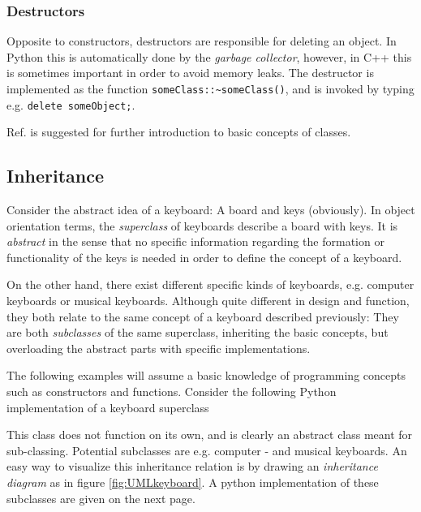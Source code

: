 \subsubsection{Destructors}

Opposite to constructors, destructors are responsible for deleting an object. In Python this is automatically done by the \textit{garbage collector}, however, in C++ this is sometimes important in order to avoid memory leaks. The destructor is implemented as the function \verb+someClass::~someClass()+, and is invoked by typing e.g. \verb+delete someObject;+.

Ref. \cite{inf1100} is suggested for further introduction to basic concepts of classes.  

\subsection{Inheritance}

Consider the abstract idea of a keyboard: A board and keys (obviously). In object orientation terms, the \textit{superclass} of keyboards describe a board with keys. It is \textit{abstract} in the sense that no specific information regarding the formation or functionality of the keys is needed in order to define the concept of a keyboard.

On the other hand, there exist different specific kinds of keyboards, e.g. computer keyboards or musical keyboards. Although quite different in design and function, they both relate to the same concept of a keyboard described previously: They are both \textit{subclasses} of the same superclass, inheriting the basic concepts, but overloading the abstract parts with specific implementations. 

The following examples will assume a basic knowledge of programming concepts such as constructors and functions. Consider the following Python implementation of a keyboard superclass

\vspace{0.5cm}



This class does not function on its own, and is clearly an abstract class meant for sub-classing. Potential subclasses are e.g. computer - and musical keyboards. An easy way to visualize this inheritance relation is by drawing an \textit{inheritance diagram} as in figure \ref{fig:UMLkeyboard}. A python implementation of these subclasses are given on the next page. 


